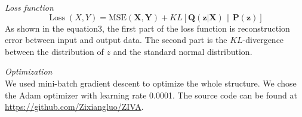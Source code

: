 \vspace{0.5cm}
\noindent\emph{Loss function} \\
\begin{equation}
    \operatorname{Loss}(X, Y)=\text {MSE}(\boldsymbol{X}, \boldsymbol{Y}) + 
    KL[\boldsymbol{Q}(\boldsymbol{z} | \boldsymbol{X}) \| \boldsymbol{P}(\boldsymbol{z})] 
\end{equation}
As shown in the equation3, the first part of the loss function is reconstruction error between input and output data. The second part is the $KL$-divergence between the distribution of $z$ and the standard normal distribution. 

\vspace{0.5cm}
\noindent\emph{Optimization} \\
We used mini-batch gradient descent to optimize the whole structure. We chose the Adam optimizer with learning rate 0.0001. The source code can be found at \url{https://github.com/Zixiangluo/ZIVA}.

